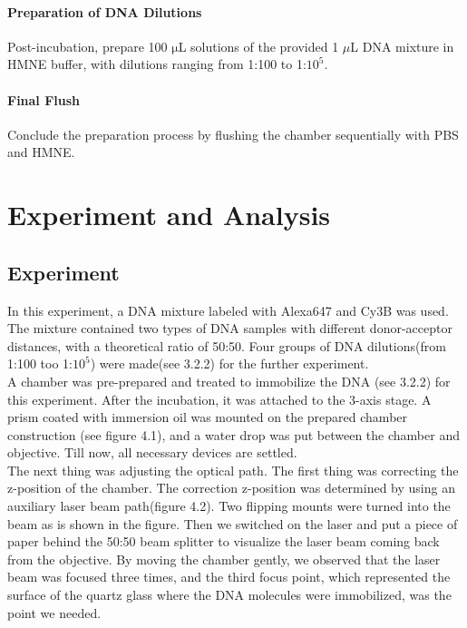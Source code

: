 \documentclass[a4paper,english,12pt,bibliography=totoc]{scrreprt}
\begin{document}
\subsubsection{Preparation of DNA Dilutions}

Post-incubation, prepare 100 $\mathrm{\mu}$L solutions of the provided 1 $\mu$L DNA mixture in HMNE buffer, with dilutions ranging from 1:100 to 1:$10^5$.

\subsubsection{Final Flush}

Conclude the preparation process by flushing the chamber sequentially with PBS and HMNE.



\chapter{Experiment and Analysis}
\label{cha:experimenandanalysis}  

\section{Experiment}
\label{sec:experiment} 

In this experiment, a DNA mixture labeled with Alexa647 and Cy3B was used. The mixture contained two types of DNA samples with different donor-acceptor distances, with a theoretical ratio of 50:50. Four groups of DNA dilutions(from 1:100 too 1:$10^5$) were made(see 3.2.2) for the further experiment.\\

A chamber was pre-prepared and treated to immobilize the DNA (see 3.2.2) for this experiment. After the incubation, it was attached to the 3-axis stage. A prism coated with immersion oil was mounted on the prepared chamber construction (see figure 4.1), and a water drop was put between the chamber and objective. Till now, all necessary devices are settled.\\

The next thing was adjusting the optical path. The first thing was correcting the z-position of the chamber. The correction z-position was determined by using an auxiliary laser beam path(figure 4.2). Two flipping mounts were turned into the beam as is shown in the figure. Then we switched on the laser and put a piece of paper behind the 50:50 beam splitter to visualize the laser beam coming back from the objective. By moving the chamber gently, we observed that the laser beam was focused three times, and the third focus point, which represented the surface of the quartz glass where the DNA molecules were immobilized, was the point we needed. \\
\end{document}
